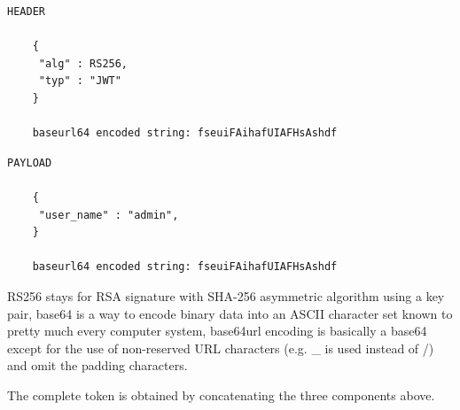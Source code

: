 \begin{verbatim}
HEADER

    {
     "alg" : RS256,
     "typ" : "JWT"
    }

    baseurl64 encoded string: fseuiFAihafUIAFHsAshdf
\end{verbatim}

\begin{verbatim}
PAYLOAD

    {
     "user_name" : "admin",
    }

    baseurl64 encoded string: fseuiFAihafUIAFHsAshdf
\end{verbatim}

RS256 stays for RSA signature with SHA-256 asymmetric algorithm using a key pair, base64 is a way to encode binary data into an ASCII character set known to pretty much every computer system, base64url encoding is basically a base64 except for the use of non-reserved URL characters (e.g. \_ is used instead of /) and omit the padding characters.

The complete token is obtained by concatenating the three components above.